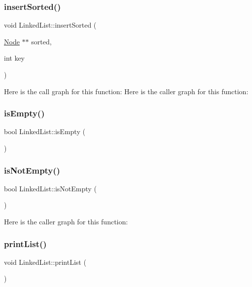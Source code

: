 \subsubsection{\texorpdfstring{insert\+Sorted()}{insertSorted()}}
{\footnotesize\ttfamily void Linked\+List\+::insert\+Sorted (\begin{DoxyParamCaption}\item[{\hyperlink{class_node}{Node} $\ast$$\ast$}]{sorted,  }\item[{int}]{key }\end{DoxyParamCaption})}

Here is the call graph for this function\+:
Here is the caller graph for this function\+:
\mbox{\label{class_linked_list_a03ff22f881325da2d37f640ab2380bf2}} 
\subsubsection{\texorpdfstring{is\+Empty()}{isEmpty()}}
{\footnotesize\ttfamily bool Linked\+List\+::is\+Empty (\begin{DoxyParamCaption}{ }\end{DoxyParamCaption})}

\mbox{\label{class_linked_list_a1a5c8f3b415fa55f7e876cf4a01f3380}} 
\subsubsection{\texorpdfstring{is\+Not\+Empty()}{isNotEmpty()}}
{\footnotesize\ttfamily bool Linked\+List\+::is\+Not\+Empty (\begin{DoxyParamCaption}{ }\end{DoxyParamCaption})}

Here is the caller graph for this function\+:
\mbox{\label{class_linked_list_ac96230938fd74a4efeb4efe8c995ee53}} 
\subsubsection{\texorpdfstring{print\+List()}{printList()}}
{\footnotesize\ttfamily void Linked\+List\+::print\+List (\begin{DoxyParamCaption}{ }\end{DoxyParamCaption})}

